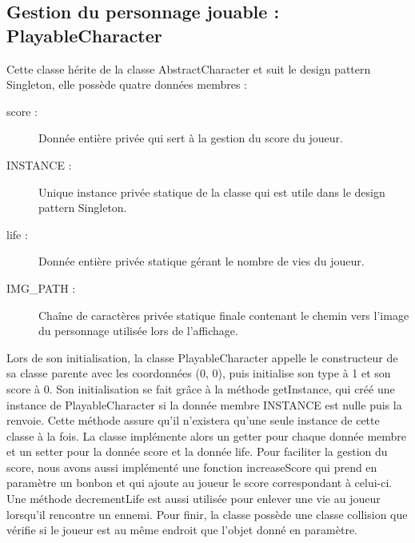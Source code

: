 \documentclass [10pt, a4paper]{article}
\begin{document}
\subsection {Gestion du personnage jouable : PlayableCharacter}
Cette classe hérite de la classe AbstractCharacter et suit le design pattern Singleton, elle possède quatre données membres :
\begin {description}
\item  [score :]     Donnée entière privée qui sert à la gestion du score du joueur.
\item  [INSTANCE :]  Unique instance privée statique de la classe qui est utile dans le design pattern Singleton. 
\item  [life :]      Donnée entière privée statique gérant le nombre de vies du joueur.
\item  [IMG\_PATH :] Chaîne de caractères privée statique finale contenant le chemin vers l'image du personnage utilisée lors de l'affichage.
\end   {description}


Lors de son initialisation, la classe PlayableCharacter appelle le constructeur de sa classe parente avec les coordonnées (0, 0), puis initialise son type à 1 et son score à 0. Son initialisation se fait grâce à la méthode getInstance, qui créé une instance de PlayableCharacter si la donnée membre INSTANCE est nulle puis la renvoie. Cette méthode assure qu'il n'existera qu'une seule instance de cette classe à la fois. La classe implémente alors un getter pour chaque donnée membre et un setter pour la donnée score et la donnée life. Pour faciliter la gestion du score, nous avons aussi implémenté une fonction increaseScore qui prend en paramètre un bonbon et qui ajoute au joueur le score correspondant à celui-ci. Une méthode decrementLife est aussi utilisée pour enlever une vie au joueur lorsqu'il rencontre un ennemi. Pour finir, la classe possède une classe collision que vérifie si le joueur est au même endroit que l'objet donné en paramètre.
\end{document}
